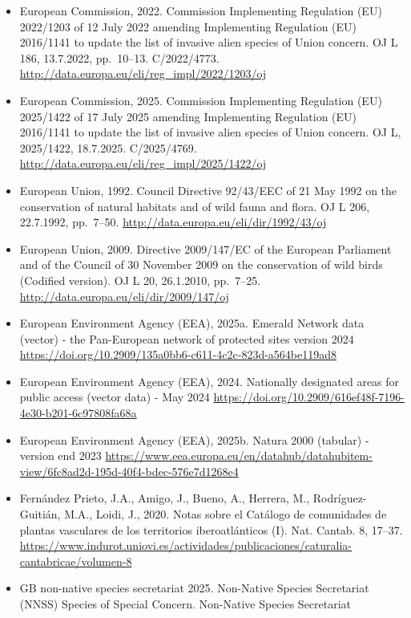 \documentclass[
]{article}
\begin{document}
\begin{itemize}
  concern. OJ L 199, 26.7.2019, pp.~1--4. C/2019/5360.
  \url{http://data.europa.eu/eli/reg_impl/2019/1262/oj}
\item
  European Commission, 2022. Commission Implementing Regulation (EU)
  2022/1203 of 12 July 2022 amending Implementing Regulation (EU)
  2016/1141 to update the list of invasive alien species of Union
  concern. OJ L 186, 13.7.2022, pp.~10--13. C/2022/4773.
  \url{http://data.europa.eu/eli/reg_impl/2022/1203/oj}
\item
  European Commission, 2025. Commission Implementing Regulation (EU)
  2025/1422 of 17 July 2025 amending Implementing Regulation (EU)
  2016/1141 to update the list of invasive alien species of Union
  concern. OJ L, 2025/1422, 18.7.2025. C/2025/4769.
  \url{http://data.europa.eu/eli/reg_impl/2025/1422/oj}
\item
  European Union, 1992. Council Directive 92/43/EEC of 21 May 1992 on
  the conservation of natural habitats and of wild fauna and flora. OJ L
  206, 22.7.1992, pp.~7--50.
  \url{http://data.europa.eu/eli/dir/1992/43/oj}
\item
  European Union, 2009. Directive 2009/147/EC of the European Parliament
  and of the Council of 30 November 2009 on the conservation of wild
  birds (Codified version). OJ L 20, 26.1.2010, pp.~7--25.
  \url{http://data.europa.eu/eli/dir/2009/147/oj}
\item
  European Environment Agency (EEA), 2025a. Emerald Network data
  (vector) - the Pan-European network of protected sites version 2024
  \url{https://doi.org/10.2909/135a0bb6-c611-4c2c-823d-a564be119ad8}
\item
  European Environment Agency (EEA), 2024. Nationally designated areas
  for public access (vector data) - May 2024
  \url{https://doi.org/10.2909/616ef48f-7196-4e30-b201-6c97808fa68a}
\item
  European Environment Agency (EEA), 2025b. Natura 2000 (tabular) -
  version end 2023
  \url{https://www.eea.europa.eu/en/datahub/datahubitem-view/6fc8ad2d-195d-40f4-bdec-576e7d1268e4}
\item
  Fernández Prieto, J.A., Amigo, J., Bueno, A., Herrera, M.,
  Rodríguez-Guitián, M.A., Loidi, J., 2020. Notas sobre el Catálogo de
  comunidades de plantas vasculares de los territorios iberoatlánticos
  (I). Nat. Cantab. 8, 17--37.
  \url{https://www.indurot.uniovi.es/actividades/publicaciones/caturalia-cantabricae/volumen-8}
\item
  GB non-native species secretariat 2025. Non-Native Species Secretariat
  (NNSS) Species of Special Concern. Non-Native Species Secretariat

\end{itemize}
\end{document}
